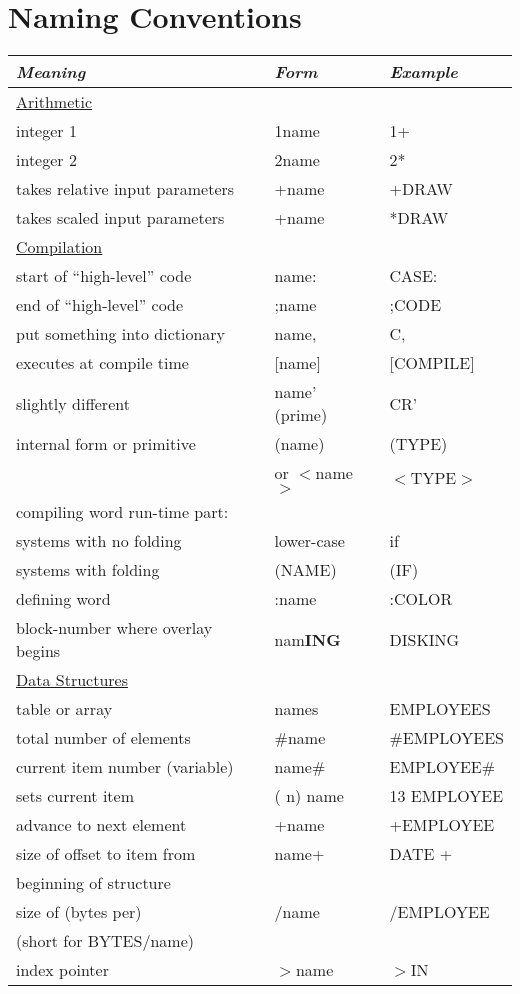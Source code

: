 \section{Naming Conventions}
\begin{longtable}{lll}
{}{\setlength{\parsep}{0cm}}%
{\em Meaning}&{\em Form}&{\em Example}\\[2ex] \endhead
\underline{Arithmetic}\\
integer 1&1name&1+\\
integer 2&2name&2*\\
takes relative input parameters&+name&+DRAW\\
takes scaled input parameters&+name&*DRAW\\[1ex]
\underline{Compilation}\\
start of ``high-level'' code&name:&CASE:\\
end of ``high-level'' code&;name&;CODE\\
put something into dictionary&name,&C,\\
executes at compile time&[name]&[COMPILE]\\
slightly different&name' (prime)&CR'\\
internal form or primitive&(name)&(TYPE)\\
&or \(<\)name\(>\)&\(<\)TYPE\(>\)\\
compiling word run-time part:\\
 systems with no folding&lower-case&if\\
 systems with folding&(NAME)&(IF)\\
defining word&:name&:COLOR\\
block-number where overlay begins&nam{\bf ING}&DISKING\\[1ex]
\underline{Data Structures}\\
table or array&names&EMPLOYEES\\
total number of elements&\#name&\#EMPLOYEES\\
current item number (variable)&name\#&EMPLOYEE\#\\
sets current item&( n) name&13 EMPLOYEE\\
advance to next element&+name&+EMPLOYEE\\
size of offset to item from&name+&DATE +\\
beginning of structure\\
size of (bytes per)&/name&/EMPLOYEE\\
(short for BYTES/name)\\
index pointer&\(>\)name&\(>\)IN\\

\end{longtable}
